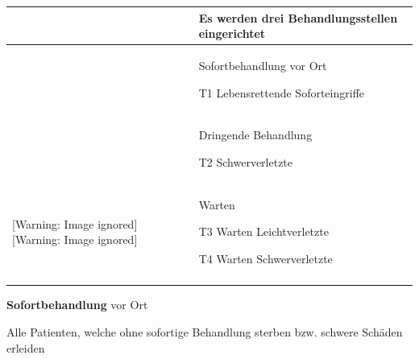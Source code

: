 \documentclass{article}
\newcommand\gEs[1]{\textbf{\textcolor[rgb]{0.0,0.0,0.5019608}{#1}}}
\newcommand\gEs[1]{\textbf{\textcolor[rgb]{0.0,0.0,0.5019608}{#1}}}
\begin{document}
\begin{flushleft}
\begin{tabular}{|m{3.328cm}|m{5.406cm}m{4.36cm}}
\hline
  [Warning: Image ignored] %
 

 &
\multicolumn{2}{m{9.966001cm}|}{{\mdseries Es werden drei
Behandlungsstellen eingerichtet}

}\\\hline
  [Warning: Image ignored] %
 

 &
\multicolumn{1}{m{5.406cm}|}{{\mdseries Sofortbehandlung vor Ort}

{\mdseries T1 Lebensrettende Soforteingriffe}

} &
\multicolumn{1}{m{4.36cm}|}{{\centering   [Warning: Image ignored]
 \par}

}\\\hline
  [Warning: Image ignored] %
 

 &
{\mdseries Dringende Behandlung}

{\mdseries T2 Schwerverletzte}

 &
\\\hhline{--~}
  [Warning: Image ignored] %
   [Warning: Image ignored] %
 

 &
{\mdseries Warten}

{\mdseries T3 Warten Leichtverletzte}

{\mdseries T4 Warten Schwerverletzte}

 &
\\\hhline{--~}
\end{tabular}
\end{flushleft}
{\mdseries\color{black}
\gEs{Sofortbehandlung} vor Ort}

{\mdseries
Alle Patienten, welche ohne sofortige Behandlung sterben bzw. schwere
Sch\"aden erleiden}
\end{document}
